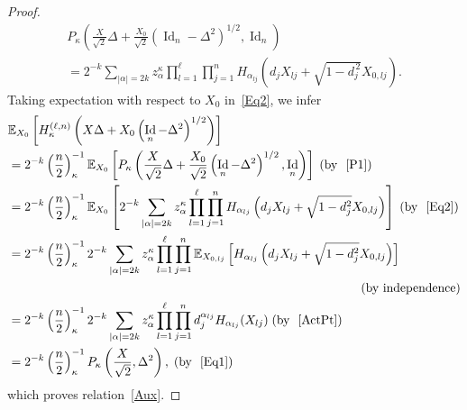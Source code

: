 \documentclass[AHL,Unicode,longabstracts,published]{cedram}
\DeclareMathOperator{\Id}{Id}
\newcommand{\EX}[2]{\mathbb{E}_{#1}\left[#2\right]}
\begin{document}
\begin{proof}
\begin{multline}\label{Eq2}
P_{\kappa}\left(\frac{X}{\sqrt{2}}\Delta+\frac{X_0}{\sqrt{2}}\left(\Id_n-\Delta^2\right)^{1/2},\Id_n\right) \\
= 2^{-k}\sum_{|\alpha|=2k} z_{\alpha}^{\kappa} \prod_{l=1}^{\ell}\prod_{j=1}^{n} H_{\alpha_{lj}}\left(d_jX_{lj}+\sqrt{1-d_j^{\,2}}X_{0,lj}\right).
\end{multline}
Taking expectation with respect to $X_0$ in~\eqref{Eq2}, we infer
\begin{align*}
&\EX{X_0}{H_{\kappa}^{(\ell,n)}\left(X\Delta+X_0\left(\Id_n-\Delta^2\right)^{1/2}\right)}\\
&= 2^{-k}\left(\frac{n}{2}\right)_{\kappa}^{-1}
\EX{X_0}{P_{\kappa}\left(\frac{X}{\sqrt{2}}\Delta+\frac{X_0}{\sqrt{2}}\left(\Id_n-\Delta^2\right)^{1/2},\Id_n\right) } \; (\text{by }~\eqref{P1})\\
&= 2^{-k}\left(\frac{n}{2}\right)_{\kappa}^{-1} \EX{X_0}{2^{-k}\sum_{|\alpha|=2k} z_{\alpha}^{\kappa} \prod_{l=1}^{\ell}\prod_{j=1}^{n} H_{\alpha_{lj}}\left(d_jX_{lj}+\sqrt{1-d_j^2}X_{0,lj}\right)} \; (\text{by }~\eqref{Eq2}) \\
&= 2^{-k}\left(\frac{n}{2}\right)_{\kappa}^{-1} 2^{-k}\sum_{|\alpha|=2k} z_{\alpha}^{\kappa} \prod_{l=1}^{\ell}\prod_{j=1}^{n} \EX{X_{0,lj}}{ H_{\alpha_{lj}}\left(d_jX_{lj}+\sqrt{1-d_j^2}X_{0,lj}\right)} \\
&\hspace{10cm}(\text{by independence})\\
&=2^{-k}\left(\frac{n}{2}\right)_{\kappa}^{-1} 2^{-k}\sum_{|\alpha|=2k} z_{\alpha}^{\kappa} \prod_{l=1}^{\ell}\prod_{j=1}^{n} d_j^{\alpha_{lj}}H_{\alpha_{lj}}(X_{lj}) \; (\text{by }~\eqref{ActPt}) \\
&= 2^{-k}\left(\frac{n}{2}\right)_{\kappa}^{-1} P_{\kappa}\left(\frac{X}{\sqrt{2}},\Delta^2\right), \; (\text{by }~\eqref{Eq1})
\end{align*}
which proves relation~\eqref{Aux}.
\end{proof}
\end{document}
